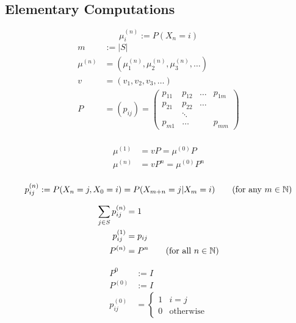 \documentclass[11pt]{article}
\newcommand{\ur}[2]{{#1}^{({#2})}}
\newcommand{\dur}[3]{{#1}_{#2}^{({#3})}}
\begin{document}
    \subsection{Elementary Computations}
    \notation
     $$\mu_i^{(n)} := P(X_n = i)$$ 
    \notation
    \begin{align*}
    	m &:= |S| \tag{the number of elements in S, could be infinity} \\
   		\mu^{(n)} &= (\mu_1^{(n)}, \mu_2^{(n)}, \mu_3^{(n)}, \hdots) \tag{$m \times 1$}\\
   		v &= (v_1, v_2, v_3, \hdots) \tag{$m \times 1$}\\
   		P &= (p_{ij}) = \begin{pmatrix}
   			p_{11} & p_{12} & \hdots & p_{1m}\\
   			p_{21} & p_{22} & \hdots & \\
   			& \ddots & &\\
   			p_{m1} & \hdots & & p_{mm}
   		\end{pmatrix} \tag{$m \times m$ matrix} \\
    \end{align*}
    
    \fact
    \begin{align*}
    	\mu^{(1)} &= vP = \ur{\mu}{0}P \\
    	\mu^{(n)} &= vP^n = \ur{\mu}{0}P^n \\
    \end{align*}
    
    \notation
    \begin{equation}
    	\dur{p}{ij}{n} := P(X_n = j, X_0 = i) = P(X_{m+n} = j | X_m = i) \tag{for any $m \in \mb{N}$}    	
    \end{equation}
    
    \fact
    \begin{align*}
    	\sum_{j\in S} \dur{p}{ij}{n} &= 1 \\
    	\dur{p}{ij}{1} &= p_{ij} \\
    	\ur{P}{n} &= P^n \tag{for all $n \in \mb{N}$}
    \end{align*}
    
    \notation
    \begin{align*}
    	 P^0 &:= I \\
    	 \ur{P}{0} &:= I \\
    	 \dur{p}{ij}{0} &= \begin{cases}
    	 	1 & i = j\\
    	 	0 & \text{otherwise}
    	 \end{cases}
    \end{align*}
    
\end{document}
